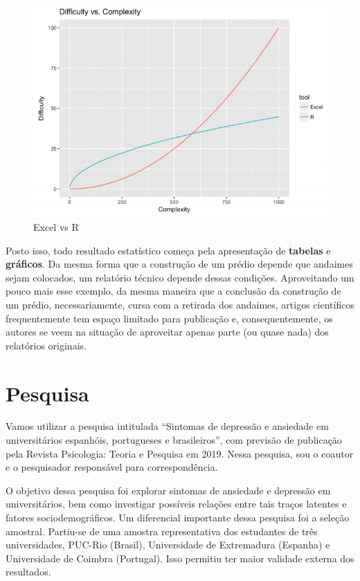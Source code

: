 \documentclass[
]{book}
\begin{document}
\begin{figure}
\centering
\includegraphics{./img/excel_r.PNG}
\caption{Excel vs R}
\end{figure}

Posto isso, todo resultado estatístico começa pela apresentação de \textbf{tabelas} e \textbf{gráficos}. Da mesma forma que a construção de um prédio depende que andaimes sejam colocados, um relatório técnico depende dessas condições. Aproveitando um pouco mais esse exemplo, da mesma maneira que a conclusão da construção de um prédio, necessariamente, cursa com a retirada dos andaimes, artigos científicos frequentemente tem espaço limitado para publicação e, consequentemente, os autores se veem na situação de aproveitar apenas parte (ou quase nada) dos relatórios originais.

\hypertarget{pesquisa}{%
\section{Pesquisa}\label{pesquisa}}

Vamos utilizar a pesquisa intitulada ``Sintomas de depressão e ansiedade em universitários espanhóis, portugueses e brasileiros'', com previsão de publicação pela Revista Psicologia: Teoria e Pesquisa em 2019. Nessa pesquisa, sou o coautor e o pesquisador responsável para correspondência.

O objetivo dessa pesquisa foi explorar sintomas de ansiedade e depressão em universitários, bem como investigar possíveis relações entre tais traços latentes e fatores sociodemográficos. Um diferencial importante dessa pesquisa foi a seleção amostral. Partiu-se de uma amostra representativa dos estudantes de três universidades, PUC-Rio (Brasil), Universidade de Extremadura (Espanha) e Universidade de Coimbra (Portugal). Isso permitiu ter maior validade externa dos resultados.
\end{document}
